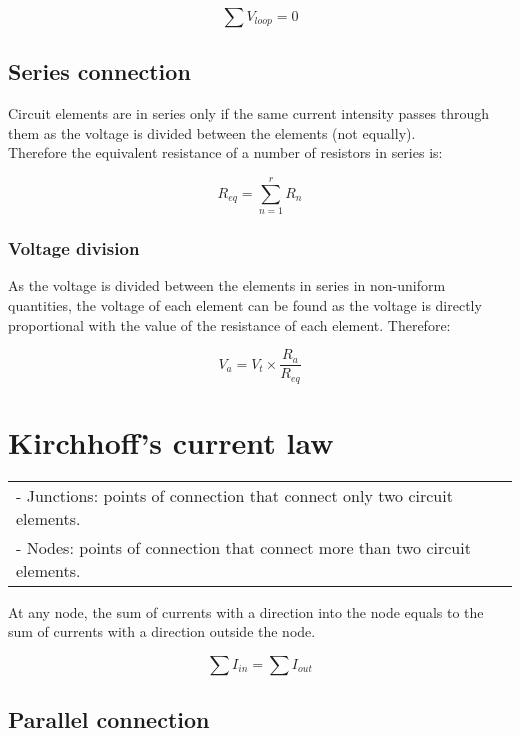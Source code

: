 \documentclass[a4paper]{book}
\begin{document}
\[\sum V_{loop} = 0\]

\subsection{Series connection}

Circuit elements are in series only if the same current intensity passes through them as the voltage is divided between the elements (not equally).\\
Therefore the equivalent resistance of a number of resistors in series is:

\[R_{eq} = \sum_{n = 1}^r R_{n}\]

\subsubsection{Voltage division}

As the voltage is divided between the elements in series in non-uniform quantities, the voltage of each element can be found as the voltage 
is directly proportional with the value of the resistance of each element. Therefore:

\[V_a = V_t \times \frac{R_a}{R_{eq}}\]

\section{Kirchhoff's current law}

\begin{center}

  \begin{tabular}{| l |}

    \hline

      - Junctions: points of connection that connect only two circuit elements.\\

      - Nodes: points of connection that connect more than two circuit elements.\\

    \hline

  \end{tabular}

\end{center}

\noindent At any node, the sum of currents with a direction into the node equals to the sum of
currents with a direction outside the node.

\[\sum I_{in} = \sum I_{out}\]

\subsection{Parallel connection}
\end{document}
